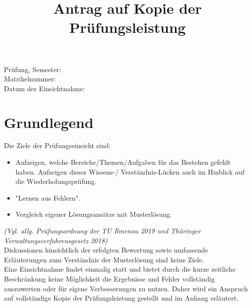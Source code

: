 \documentclass[12pt, a4paper]{article}
\title{Antrag auf Kopie der Prüfungsleistung}
\author{}
\date{}
\begin{document}
\maketitle

\begin{Form}
    \centering
    \noindent Prüfung, Semester: \TextField[name=Prüfung,width=8cm, charsize=10pt, bordercolor={0 1 1}, value={}] {\mbox{}}\\
    \vspace{0.5cm}
    \noindent Matrikelnummer: \TextField[name=Matrikelnummer,width=8.4cm, charsize=10pt, bordercolor={0 1 1}, value={}] {\mbox{}}\\
    \vspace{0.5cm}
    \noindent Datum der Einsichtnahme: \TextField[name=Matrikelnummer,width=6.6cm, charsize=10pt, bordercolor={0 1 1}, value={}] {\mbox{}}\\
    \vspace{0.5cm}
\end{Form}

\section{Grundlegend}
Die Ziele der Prüfungseinsicht sind:
\begin{itemize}
    \item Aufzeigen, welche Bereiche/Themen/Aufgaben für das Bestehen gefehlt haben. Aufzeigen dieser Wissens-/ Verständnis-Lücken auch im Hinblick auf die Wiederholungsprüfung.
    \item "Lernen aus Fehlern".
    \item Vergleich eigener Lösungsansätze mit Musterlösung.
\end{itemize}
\textit{\scriptsize(Vgl. allg. Prüfungsordnung der TU Ilmenau 2019 und Thüringer Verwaltungsverfahrensgesetz 2018)}\\
Diskussionen hinsichtlich der erfolgten Bewertung sowie umfassende Erläuterungen zum Verständnis der Musterlösung sind keine Ziele. \\
Eine Einsichtnahme findet einmalig statt und bietet durch die kurze zeitliche Beschränkung keine Möglichkeit die Ergebnisse und Fehler vollständig auszuwerten oder für eigene Verbesserungen zu nutzen. Daher wird ein Anspruch auf vollständige Kopie der Prüfungsleistung gestellt und im Anhang erläutert.

\vspace{2cm}
\end{document}
